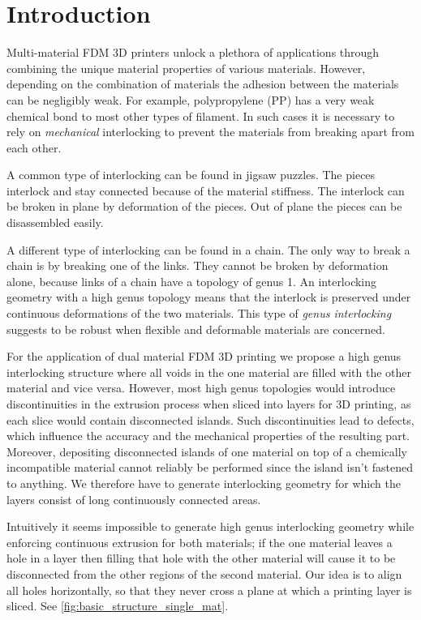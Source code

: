 \section{Introduction}
Multi-material FDM 3D printers unlock a plethora of applications through combining the unique material properties of various materials.
However, depending on the combination of materials the adhesion between the materials can be negligibly weak.
For example, polypropylene (PP) has a very weak chemical bond to most other types of filament.
In such cases it is necessary to rely on \emph{mechanical} interlocking to prevent the materials from breaking apart from each other.

A common type of interlocking can be found in jigsaw puzzles.
The pieces interlock and stay connected because of the material stiffness.
The interlock can be broken in plane by deformation of the pieces.
Out of plane the pieces can be disassembled easily.

A different type of interlocking can be found in a chain.
The only way to break a chain is by breaking one of the links.
They cannot be broken by deformation alone, because links of a chain have a topology of genus 1.
An interlocking geometry with a high genus topology means that the interlock is preserved under continuous deformations of the two materials.
This type of \emph{genus interlocking} suggests to be robust when flexible and deformable materials are concerned.

For the application of dual material FDM 3D printing we propose a high genus interlocking structure where all voids in the one material are filled with the other material and vice versa.
However, most high genus topologies would introduce discontinuities in the extrusion process when sliced into layers for 3D printing, as each slice would contain disconnected islands.
Such discontinuities lead to defects, which influence the accuracy and the mechanical properties of the resulting part.
Moreover, depositing disconnected islands of one material on top of a chemically incompatible material cannot reliably be performed since the island isn't fastened to anything.
We therefore have to generate interlocking geometry for which the layers consist of long continuously connected areas.

Intuitively it seems impossible to generate high genus interlocking geometry while enforcing continuous extrusion for both materials;
if the one material leaves a hole in a layer then filling that hole with the other material will cause it to be disconnected from the other regions of the second material.
Our idea is to align all holes horizontally, so that they never cross a plane at which a printing layer is sliced.
See \cref{fig:basic_structure_single_mat}.


